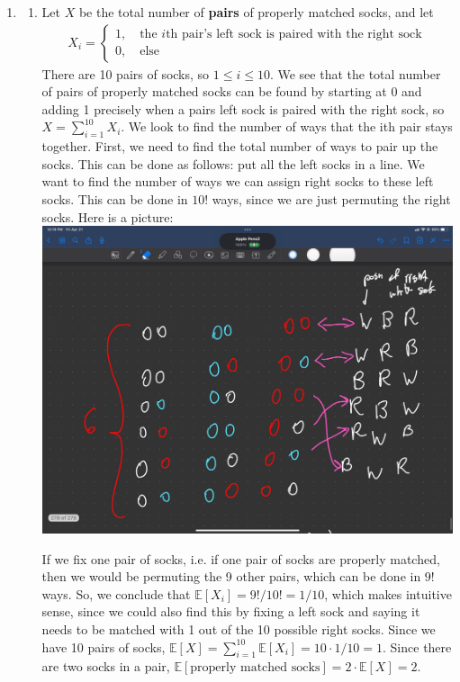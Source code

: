 \documentclass[12pt]{article}
\theoremstyle{definition}
\theoremstyle{remark}
\newcommand{\E}{\mathbb{E}}
\begin{document}
\begin{enumerate}[leftmargin=\labelsep]
		\newpage
		\item 
		\begin{enumerate}
			Throughout this problem I will count the number of \textbf{socks}, NOT the number of pairs.
			\item Let $X$ be the total number of \textbf{pairs} of properly matched socks, and let \begin{align*}
				X_i = \begin{cases}
				1, \quad \text{the $i$th pair's left sock is paired with the right sock} \\
				0, \quad \text{else}
			\end{cases}
			\end{align*}
			There are 10 pairs of socks, so $1 \leq i \leq 10$. We see that the total number of pairs of properly matched socks can be found by starting at 0 and adding 1 precisely when a pairs left sock is paired with the right sock, so $X = \sum_{i=1}^{10} X_i$. We look to find the number of ways that the ith pair stays together. First, we need to find the total number of ways to pair up the socks. This can be done as follows: put all the left socks in a line. We want to find the number of ways we can assign right socks to these left socks. This can be done in $10!$ ways, since we are just permuting the right socks. Here is a picture:
			\includegraphics[width=\textwidth]{IMG_0084.jpeg}
			
			If we fix one pair of socks, i.e. if one pair of socks are properly matched, then we would be permuting the 9 other pairs, which can be done in $9!$ ways. So, we conclude that $\E[X_i] = 9!/10! = 1/10$, which makes intuitive sense, since we could also find this by fixing a left sock and saying it needs to be matched with 1 out of the 10 possible right socks. Since we have 10 pairs of socks, $\E[X] = \sum_{i=1}^{10} \E[X_i] = 10 \cdot 1/10 = 1$. Since there are two socks in a pair, $\E[\text{properly matched socks}] = 2 \cdot \E[X] = 2$.
			

\end{enumerate}
\end{enumerate}
\end{document}
